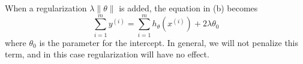 \begin{answer}
    When a regularization $\lambda \|\theta\|$ is added, the equation in (b) becomes
    $$
    \sum_{i=1}^m y^{(i)} = \sum_{i=1}^m h_\theta(x^{(i)}) + 2\lambda \theta_0
    $$
    where $\theta_0$ is the parameter for the intercept. In general, we will not penalize this term, and in this case regularization will have no effect.

\end{answer}
